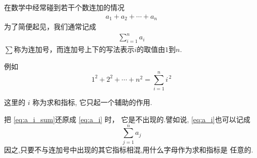 \documentclass[13pt,punct]{ctexbeamer}
\begin{document}
\begin{frame}
		\small{
	在数学中经常碰到若干个数连加的情况
	\begin{align}\label{eq:a_i}
		a_1+a_2+\cdots+a_n
	\end{align}
	为了简便起见，我们通常记成
	\begin{align}\label{eq:a_i_sum}
		\sum_{i=1}^{n}a_i
	\end{align}
	$\sum$称为\alert{连加号}，而连加号上下的写法表示$i$的取值由$1$到$n$.

	例如
	\[1^2+2^2+\cdots+n^2=\sum_{i=1}^{n}i^{\, 2}\]

	这里的 $i$ 称为\alert{求和指标}, 它只起一个辅助的作用.

	把 \eqref{eq:a_i_sum}还原成 \eqref{eq:a_i} 时，
	它是不出现的.譬如说, \eqref{eq:a_i}也可以记成
	$$
	\sum_{j=1}^{n} a_{j}
	$$
因之,只要不与连加号中出现的其它指标相混,用什么字母作为求和指标是
	任意的.}
\end{frame}
\end{document}
